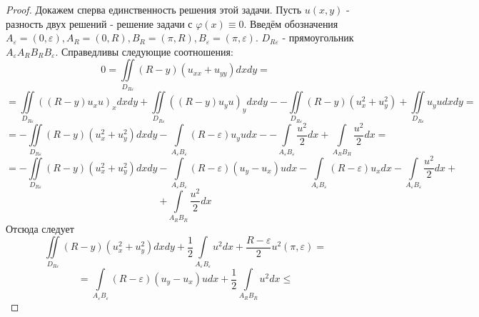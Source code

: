 \documentclass[a4paper, 12pt]{article}
\numberwithin{equation}{section}
\numberwithin{lemma}{section}
\numberwithin{definition}{section}
\numberwithin{notabene}{section}
\numberwithin{corollary}{section}
\begin{document}
\begin{proof}
   	Докажем сперва единственность решения этой задачи. Пусть $u(x,y)$ - разность двух решений - решение задачи с $\varphi(x) \equiv 0$. \newline
   	Введём обозначения $A_\varepsilon = (0, \varepsilon), A_R = (0, R), B_R = (\pi, R), B_\varepsilon = (\pi, \varepsilon)$. $D_{R\varepsilon}$ - прямоугольник $A_\varepsilon A_R B_R B_\varepsilon$. Справедливы следующие соотношения:
   	\begin{equation*}
   		0 = \iint\limits_{D_{R\varepsilon}} (R-y) (u_{xx} + u_{yy}) dx dy = 
   	\end{equation*}
   \begin{equation*}
   =	\iint\limits_{D_{R\varepsilon}} \left( \left(R - y\right) u_x u\right)_x dx dy  + \iint\limits_{D_{R\varepsilon}} \left( \left(R - y\right) u_y u\right)_y dx dy  - 
   		- \iint\limits_{D_{R\varepsilon}} \left(R- y\right) \left(u_x^2 + u_y^2\right) + \iint\limits_{D_{R\varepsilon}} u_y u dx dy = 
   	\end{equation*}
 	\begin{equation*}
 		= - \iint\limits_{D_{R\varepsilon}} \left(R - y\right) \left(u_x^2 + u_y^2\right) dx dy
 		 - \int\limits_{A_\varepsilon B_\varepsilon} \left(R - \varepsilon\right) u_y u dx - 
 		 -\int\limits_{A_\varepsilon B_\varepsilon} \dfrac{u^2}{2} dx + \int\limits_{A_R B_R} \dfrac{u^2}{2} dx = 
 	\end{equation*}
 	\begin{equation*}
 		= - \iint\limits_{D_{R\varepsilon}} \left(R - y\right) \left(u_x^2 + u_y^2\right) dx dy - 
 		\int\limits_{A_\varepsilon B_\varepsilon} \left(R - \varepsilon \right) \left(u_y - u_x\right)u dx - \int\limits_{A_\varepsilon B_\varepsilon} \left(R - \varepsilon\right) u_x dx - \int\limits_{A_\varepsilon B_\varepsilon}\dfrac{u^2}{2} dx +
 	\end{equation*}
 	\begin{equation*}
 		+ \int\limits_{A_R B_R} \dfrac{u^2}{2}dx
 	\end{equation*}
 	Отсюда следует
 	\begin{equation*}
 	\iint\limits_{D_{R\varepsilon}} \left(R - y\right) \left(u_x^2 + u_y^2\right) dx dy + \dfrac{1}{2}\int\limits_{A_\varepsilon B_\varepsilon} u^2 dx +\dfrac{R - \varepsilon}{2}u^2(\pi, \varepsilon)  =
 	\end{equation*}
 	\begin{equation*}
 	= \int\limits_{A_\varepsilon B_\varepsilon} \left(R - \varepsilon \right) \left(u_y - u_x\right)u dx + \dfrac12  \int\limits_{A_R B_R} u^2 dx \leq

\end{equation*}
\end{proof}
\end{document}
